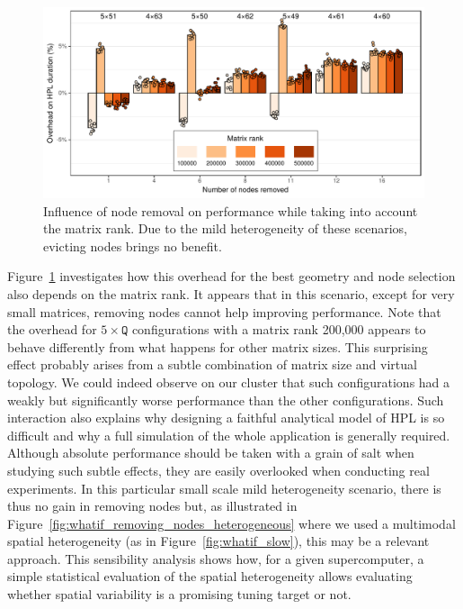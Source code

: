         \begin{figure}[htpb]
            \centering
            \includegraphics[width=\linewidth]{img/prediction/sensibility/spatial/whatif_removing_nodes_2.pdf}
            \caption{Influence of node removal on performance while taking into account the matrix rank. Due to the mild
            heterogeneity of these scenarios, evicting nodes brings no benefit.}
            \label{fig:whatif_removing_nodes_2}
        \end{figure}

        Figure~\ref{fig:whatif_removing_nodes_2} investigates how this overhead for the best geometry and node selection
        also depends on the matrix rank. It appears that in this scenario, except for very small matrices, removing
        nodes cannot help improving performance. Note that the overhead for \(5\times\texttt{Q}\) configurations with a
        matrix rank 200,000 appears to behave differently from what happens for other matrix sizes. This surprising
        effect probably arises from a subtle combination of matrix size and virtual topology. We could indeed observe on
        our cluster that such configurations had a weakly but significantly worse performance than the other
        configurations. Such interaction also explains why designing a faithful analytical model of HPL is so difficult
        and why a full simulation of the whole application is generally required.  Although absolute performance should
        be taken with a grain of salt when studying such subtle effects, they are easily overlooked when conducting real
        experiments. In this particular small scale mild heterogeneity scenario, there is thus no gain in removing nodes
        but, as illustrated in Figure~\ref{fig:whatif_removing_nodes_heterogeneous} where we used a multimodal spatial
        heterogeneity (as in Figure~\ref{fig:whatif_slow}), this may be a relevant approach.  This sensibility analysis
        shows how, for a given supercomputer, a simple statistical evaluation of the spatial heterogeneity allows
        evaluating whether spatial variability is a promising tuning target or not.

